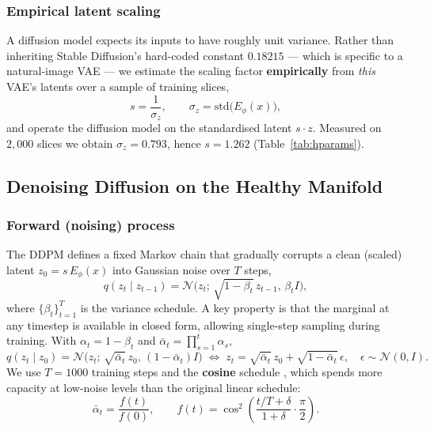 \documentclass[12pt, a4paper]{article}
\begin{document}
\subsubsection{Empirical latent scaling}
A diffusion model expects its inputs to have roughly unit variance. Rather than inheriting Stable Diffusion's hard-coded constant $0.18215$ — which is specific to a natural-image VAE — we estimate the scaling factor \textbf{empirically} from \emph{this} VAE's latents over a sample of training slices,
\begin{equation}
    s = \frac{1}{\sigma_z}, \qquad \sigma_z = \mathrm{std}\big(E_\phi(x)\big),
\end{equation}
and operate the diffusion model on the standardised latent $s\cdot z$. Measured on $2{,}000$ slices we obtain $\sigma_z = 0.793$, hence $s = 1.262$ (Table~\ref{tab:hparams}).

\subsection{Denoising Diffusion on the Healthy Manifold}
\subsubsection{Forward (noising) process}
The DDPM \cite{ho2020} defines a fixed Markov chain that gradually corrupts a clean (scaled) latent $z_0 = s\,E_\phi(x)$ into Gaussian noise over $T$ steps,
\begin{equation}
    q(z_t \mid z_{t-1}) = \mathcal{N}\!\big(z_t;\, \sqrt{1-\beta_t}\,z_{t-1},\, \beta_t I\big),
\end{equation}
where $\{\beta_t\}_{t=1}^T$ is the variance schedule. A key property is that the marginal at any timestep is available in closed form, allowing single-step sampling during training. With $\alpha_t = 1-\beta_t$ and $\bar{\alpha}_t = \prod_{s=1}^{t}\alpha_s$,
\begin{equation}
    q(z_t\mid z_0) = \mathcal{N}\!\big(z_t;\, \sqrt{\bar{\alpha}_t}\,z_0,\, (1-\bar{\alpha}_t)I\big)
    \;\Longleftrightarrow\;
    z_t = \sqrt{\bar{\alpha}_t}\,z_0 + \sqrt{1-\bar{\alpha}_t}\,\epsilon,\quad \epsilon\sim\mathcal{N}(0,I).
    \label{eq:forward}
\end{equation}
We use $T=1000$ training steps and the \textbf{cosine} schedule \cite{nichol2021}, which spends more capacity at low-noise levels than the original linear schedule:
\begin{equation}
    \bar{\alpha}_t = \frac{f(t)}{f(0)}, \qquad f(t) = \cos^2\!\left(\frac{t/T + \delta}{1+\delta}\cdot\frac{\pi}{2}\right).
\end{equation}
\end{document}
